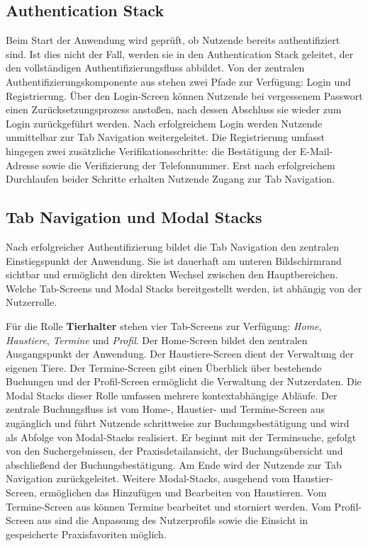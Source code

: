 \subsection{Authentication Stack}

Beim Start der Anwendung wird geprüft, ob Nutzende bereits
authentifiziert sind. Ist dies nicht der Fall, werden sie in den Authentication Stack geleitet, der den vollständigen Authentifizierungsfluss abbildet. Von der zentralen Authentifizierungskomponente aus stehen zwei Pfade zur Verfügung: Login und Registrierung. Über den Login-Screen können Nutzende bei vergessenem Passwort einen Zurücksetzungsprozess anstoßen, nach dessen Abschluss sie wieder zum Login zurückgeführt werden. Nach erfolgreichem Login werden Nutzende unmittelbar zur Tab Navigation weitergeleitet. Die Registrierung umfasst hingegen zwei zusätzliche Verifikationsschritte: die Bestätigung der E-Mail-Adresse sowie die Verifizierung der Telefonnummer. Erst nach erfolgreichem Durchlaufen beider Schritte erhalten Nutzende Zugang zur Tab Navigation.

\subsection{Tab Navigation und Modal Stacks}

Nach erfolgreicher Authentifizierung bildet die Tab Navigation den 
zentralen Einstiegspunkt der Anwendung. Sie ist dauerhaft am unteren Bildschirmrand sichtbar und ermöglicht den direkten Wechsel zwischen den Hauptbereichen. Welche Tab-Screens und Modal Stacks bereitgestellt werden, ist abhängig von der Nutzerrolle.

Für die Rolle \textbf{Tierhalter} stehen vier Tab-Screens zur Verfügung: \textit{Home}, \textit{Haustiere}, \textit{Termine} und \textit{Profil}. Der Home-Screen bildet den zentralen Ausgangspunkt der Anwendung. Der Haustiere-Screen dient der Verwaltung der eigenen Tiere. Der Termine-Screen gibt einen Überblick über bestehende Buchungen und der Profil-Screen ermöglicht die Verwaltung der Nutzerdaten. Die Modal Stacks dieser Rolle umfassen mehrere kontextabhängige Abläufe. Der zentrale Buchungsfluss ist vom Home-, Haustier- und Termine-Screen aus zugänglich und 
führt Nutzende schrittweise zur Buchungsbestätigung und wird als Abfolge von Modal-Stacks realisiert. Er beginnt mit der Terminsuche, gefolgt von den Suchergebnissen, der Praxisdetailansicht, der Buchungsübersicht und abschließend der Buchungsbestätigung. Am Ende wird der Nutzende zur Tab Navigation zurückgeleitet. Weitere Modal-Stacks, ausgehend vom Haustier-Screen, ermöglichen das Hinzufügen und Bearbeiten von Haustieren. Vom Termine-Screen aus können Termine bearbeitet und storniert werden. Vom Profil-Screen aus sind die Anpassung des Nutzerprofils sowie die Einsicht in gespeicherte Praxisfavoriten möglich.

